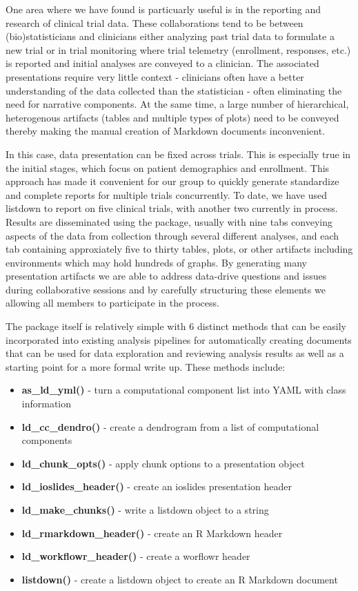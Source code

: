 \documentclass[
]{jss}
\begin{document}
One area where we have found  is particuarly useful is in
the reporting and research of clinical trial data. These collaborations
tend to be between (bio)statisticians and clinicians either analyzing
past trial data to formulate a new trial or in trial monitoring where
trial telemetry (enrollment, responses, etc.) is reported and initial
analyses are conveyed to a clinician. The associated presentations
require very little context - clinicians often have a better
understanding of the data collected than the statistician - often
eliminating the need for narrative components. At the same time, a large
number of hierarchical, heterogenous artifacts (tables and multiple
types of plots) need to be conveyed thereby making the manual creation
of  Markdown documents inconvenient.

In this case, data presentation can be fixed across trials. This is
especially true in the initial stages, which focus on patient
demographics and enrollment. This approach has made it convenient for
our group to quickly generate standardize and complete reports for
multiple trials concurrently. To date, we have used listdown to report
on five clinical trials, with another two currently in process. Results
are disseminated using the  package, usually with nine
tabs conveying aspects of the data from collection through several
different analyses, and each tab containing approxiately five to thirty
tables, plots, or other artifacts including 
\citep{trelliscopejs} environments which may hold hundreds of graphs. By
generating many presentation artifacts we are able to address data-drive
questions and issues during collaborative sessions and by carefully
structuring these elements we allowing all members to participate in the
process.

The  package itself is relatively simple with 6 distinct
methods that can be easily incorporated into existing analysis pipelines
for automatically creating documents that can be used for data
exploration and reviewing analysis results as well as a starting point
for a more formal write up. These methods include:

\begin{itemize}
\item{\bf as\_ld\_yml() }{- turn a computational component list into YAML with class information}
\item{\bf ld\_cc\_dendro() }{- create a dendrogram from a list of computational components}
\item{\bf ld\_chunk\_opts() }{- apply chunk options to a presentation object}
\item{\bf ld\_ioslides\_header() }{- create an ioslides presentation header}
\item{\bf ld\_make\_chunks() }{- write a listdown object to a string}
\item{\bf ld\_rmarkdown\_header() }{- create an R Markdown header}
\item{\bf ld\_workflowr\_header() }{- create a worflowr header}
\item{\bf listdown() }{- create a listdown object to create an R Markdown document}
\end{itemize}
\end{document}

